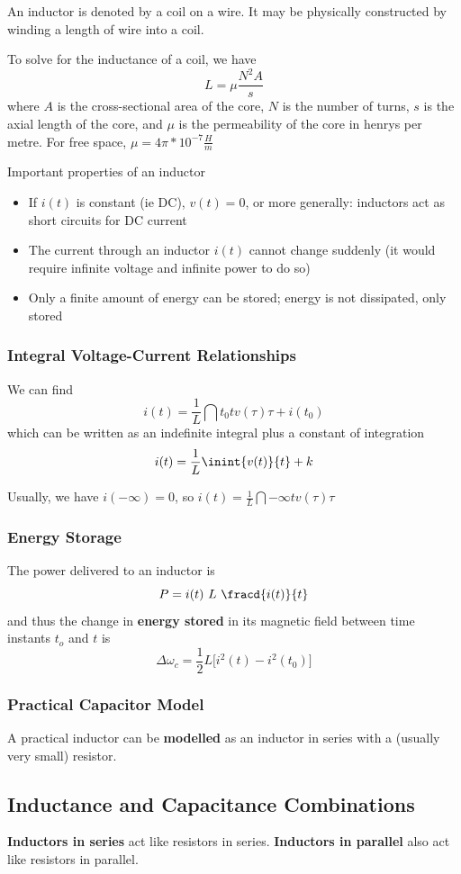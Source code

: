 \documentclass[12pt]{article}
\begin{document}
An inductor is denoted by a coil on a wire. It may be physically constructed by winding a length of wire into a coil.

To solve for the inductance of a coil, we have \[ L = \mu \frac{N^2 A}{s} \] where $A$ is the cross-sectional area of the core, $N$ is the number of turns, $s$ is the axial length of the core, and $\mu$ is the permeability of the core in henrys per metre. For free space, $\mu = 4\pi * 10^{-7} \frac{H}{m}$

Important properties of an inductor
\begin{itemize}
\item If $i(t)$ is constant (ie DC), $v(t) = 0$, or more generally: inductors act as short circuits for DC current
\item The current through an inductor $i(t)$ cannot change suddenly (it would require infinite voltage and infinite power to do so)
\item Only a finite amount of energy can be stored; energy is not dissipated, only stored
\end{itemize}

\subsubsection*{Integral Voltage-Current Relationships}
We can find \[ i(t) = \frac{1}{L} \dint{t_0}{t}{v(\tau)}{\tau} + i(t_0) \] which can be written as an indefinite integral plus a constant of integration \[ i(t) = \frac{1}{L} \inint{v(t)}{t} + k \]

Usually, we have $i(-\infty) = 0$, so $i(t) = \frac{1}{L} \dint{-\infty}{t}{v(\tau)}{\tau}$

\subsubsection*{Energy Storage}
The power delivered to an inductor is \[ P = i(t)\ L\ \fracd{i(t)}{t} \] and thus the change in {\bf energy stored} in its magnetic field between time instants $t_o$ and $t$ is \[ \Delta\omega_c = \frac{1}{2}L\bigl[i^2(t) - i^2(t_0)\bigl] \]

\subsubsection*{Practical Capacitor Model}
A practical inductor can be {\bf modelled} as an inductor in series with a (usually very small) resistor.

\subsection*{Inductance and Capacitance Combinations}
{\bf Inductors in series} act like resistors in series. {\bf Inductors in parallel} also act like resistors in parallel.
\end{document}
